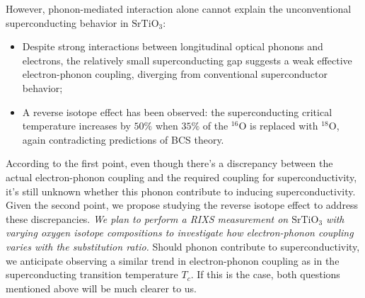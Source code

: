 \documentclass[11pt]{article}
\begin{document}
However, phonon-mediated interaction alone cannot explain the unconventional superconducting behavior in $\mathrm{SrTiO_{3}}$:
\begin{itemize}
  \item Despite strong interactions between longitudinal optical phonons and electrons, the relatively small superconducting gap suggests a weak effective electron-phonon coupling, diverging from conventional superconductor behavior; 
  \item A reverse isotope effect has been observed: the superconducting critical temperature increases by $50\%$  when $35\%$ of the ${}^{16}\mathrm{O}$ is replaced with ${}^{18}\mathrm{O}$\cite{stucky_isotope_2016}, again contradicting predictions of BCS theory.
\end{itemize}
According to the first point, even though there's a discrepancy between the actual electron-phonon coupling and the required coupling for superconductivity, it's still unknown whether this phonon contribute to inducing superconductivity. Given the second point, we propose studying the reverse isotope effect to address these discrepancies. \textit{We plan to perform a RIXS measurement on $\mathrm{SrTiO_{3}}$ with varying oxygen isotope compositions to investigate how electron-phonon coupling varies with the substitution ratio.}  Should phonon contribute to superconductivity, we anticipate observing a similar trend in electron-phonon coupling as in the superconducting transition temperature $T_{c}$. If this is the case, both questions mentioned above will be much clearer to us. 
\end{document}
